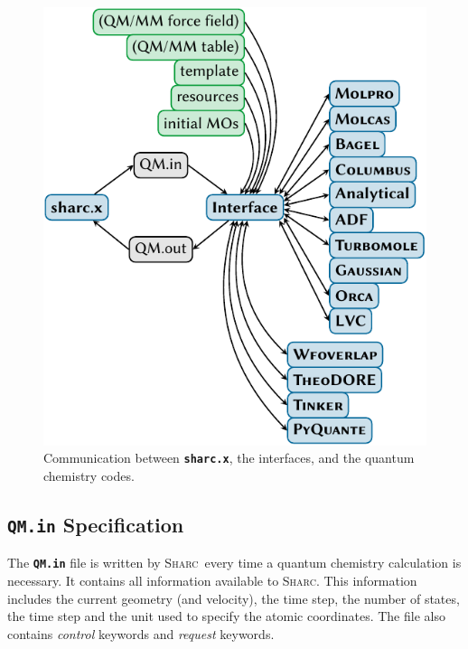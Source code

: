 \documentclass[a4paper,10pt,DIV=15,openany]{scrbook}
\newcommand{\sharc}{\textsc{Sharc}}
\newcommand{\ttt}[1]{\textbf{\texttt{#1}}}
\begin{document}
\begin{figure}[htb]
  \centering
  \includegraphics[scale=1]{img/interfaces/general.pdf}
  \caption{Communication between \ttt{sharc.x}, the interfaces, and the quantum chemistry codes.}
  \label{fig:interface_general}
\end{figure}

\subsection{\ttt{QM.in} Specification}\label{intf:qmin}

The \ttt{QM.in} file is written by \sharc\ every time a quantum chemistry calculation is necessary. It contains all information available to \sharc. This information includes the current geometry (and velocity), the time step, the number of states, the time step and the unit used to specify the atomic coordinates. The file also contains \textit{control} keywords and \textit{request} keywords. 
\end{document}
